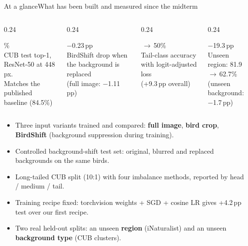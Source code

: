 \documentclass[aspectratio=169,10pt]{beamer}
\newcommand{\serif}{\fontfamily{ppl}\selectfont}
\newcommand{\hl}[1]{\textcolor{accent}{#1}}
\newcommand{\stat}[2]{%
  \begin{minipage}[t]{\linewidth}\centering
    {\serif\fontsize{26}{28}\selectfont #1}\\[0.15cm]
    {\footnotesize #2}
  \end{minipage}}
\begin{document}
\begin{frame}{At a glance}{What has been built and measured since the midterm}
\vspace{0.3cm}
\begin{columns}[t]
\begin{column}{0.24\textwidth}\stat{84.55\%}{CUB test top-1, ResNet-50 at 448\,px.\\Matches the published baseline (84.5\%)}\end{column}
\begin{column}{0.24\textwidth}\stat{$-$0.23\,pp}{BirdShift drop when the background is replaced\\(full image: $-$1.11\,pp)}\end{column}
\begin{column}{0.24\textwidth}\stat{23\,$\to$\,50\%}{Tail-class accuracy with logit-adjusted loss\\(+9.3\,pp overall)}\end{column}
\begin{column}{0.24\textwidth}\stat{$-$19.3\,pp}{Unseen region: 81.9\,$\to$\,62.7\%\\(unseen background: $-$1.7\,pp)}\end{column}
\end{columns}
\vspace{0.5cm}
\begin{itemize}\small
  \item Three input variants trained and compared: \textbf{full image}, \textbf{bird crop}, \textbf{BirdShift} (background suppression during training).
  \item Controlled background-shift test set: original, blurred and replaced backgrounds on the same birds.
  \item Long-tailed CUB split (10:1) with four imbalance methods, reported by head / medium / tail.
  \item Training recipe fixed: torchvision weights + SGD + cosine LR gives \hl{+4.2\,pp} test over our first recipe.
  \item Two real held-out splits: an unseen \textbf{region} (iNaturalist) and an unseen \textbf{background type} (CUB clusters).
\end{itemize}
\end{frame}
\end{document}
